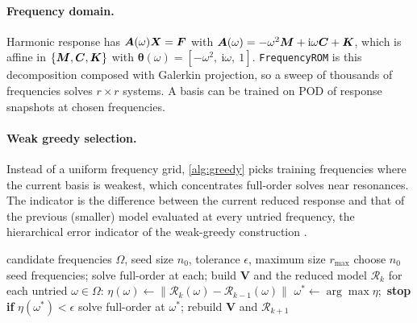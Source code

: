 \paragraph{Frequency domain.}
Harmonic response has $\bm A(\omega)\bm X=\bm{F}$ with $\bm A(\omega)=-\omega^2\bm{M}+\mathrm i\omega\bm{C}+\bm{K}$, which is affine in $\{\bm{M},\bm{C},\bm{K}\}$ with $\bm\theta(\omega)=[-\omega^2,\ \mathrm i\omega,\ 1]$. \texttt{FrequencyROM} is this decomposition composed with Galerkin projection, so a sweep of thousands of frequencies solves $r\times r$ systems.
A basis can be trained on POD of response snapshots at chosen frequencies.

\paragraph{Weak greedy selection.}
Instead of a uniform frequency grid, \cref{alg:greedy} picks training frequencies where the current basis is weakest, which concentrates full-order solves near resonances. The indicator is the difference between the current reduced response and that of the previous (smaller) model evaluated at every untried frequency, the hierarchical error indicator of the weak-greedy construction \cite{hesthaven2016rb}.

\begin{algorithm}[t]
\caption{Weak-greedy frequency basis}\label{alg:greedy}
\begin{algorithmic}[1]
\Require candidate frequencies $\Omega$, seed size $n_0$, tolerance $\epsilon$, maximum size $r_{\max}$
\State choose $n_0$ seed frequencies; solve full-order at each; build $\bm V$ and the reduced model $\mathcal R_k$
  \State for each untried $\omega\in\Omega$: $\eta(\omega)\gets\|\mathcal R_k(\omega)-\mathcal R_{k-1}(\omega)\|$ 
  \State $\omega^\ast\gets\arg\max\eta$;\ \textbf{stop if} $\eta(\omega^\ast)<\epsilon$
  \State solve full-order at $\omega^\ast$; rebuild $\bm V$ and $\mathcal R_{k+1}$
\EndFor
\end{algorithmic}
\end{algorithm}

